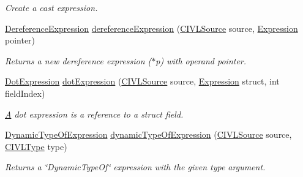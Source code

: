 \begin{DoxyCompactItemize}
\begin{DoxyCompactList}\small\item\em Create a cast expression. \end{DoxyCompactList}\item 
\hyperlink{interfaceedu_1_1udel_1_1cis_1_1vsl_1_1civl_1_1model_1_1IF_1_1expression_1_1DereferenceExpression}{Dereference\+Expression} \hyperlink{interfaceedu_1_1udel_1_1cis_1_1vsl_1_1civl_1_1model_1_1IF_1_1ModelFactory_a0fcf4f15d4e2342201d2f5cc9ed29f3b}{dereference\+Expression} (\hyperlink{interfaceedu_1_1udel_1_1cis_1_1vsl_1_1civl_1_1model_1_1IF_1_1CIVLSource}{C\+I\+V\+L\+Source} source, \hyperlink{interfaceedu_1_1udel_1_1cis_1_1vsl_1_1civl_1_1model_1_1IF_1_1expression_1_1Expression}{Expression} pointer)
\begin{DoxyCompactList}\small\item\em Returns a new dereference expression ($\ast$p) with operand pointer. \end{DoxyCompactList}\item 
\hyperlink{interfaceedu_1_1udel_1_1cis_1_1vsl_1_1civl_1_1model_1_1IF_1_1expression_1_1DotExpression}{Dot\+Expression} \hyperlink{interfaceedu_1_1udel_1_1cis_1_1vsl_1_1civl_1_1model_1_1IF_1_1ModelFactory_a07f99c08ea2f38b4638f7e189403c17e}{dot\+Expression} (\hyperlink{interfaceedu_1_1udel_1_1cis_1_1vsl_1_1civl_1_1model_1_1IF_1_1CIVLSource}{C\+I\+V\+L\+Source} source, \hyperlink{interfaceedu_1_1udel_1_1cis_1_1vsl_1_1civl_1_1model_1_1IF_1_1expression_1_1Expression}{Expression} struct, int field\+Index)
\begin{DoxyCompactList}\small\item\em \hyperlink{structA}{A} dot expression is a reference to a struct field. \end{DoxyCompactList}\item 
\hyperlink{interfaceedu_1_1udel_1_1cis_1_1vsl_1_1civl_1_1model_1_1IF_1_1expression_1_1DynamicTypeOfExpression}{Dynamic\+Type\+Of\+Expression} \hyperlink{interfaceedu_1_1udel_1_1cis_1_1vsl_1_1civl_1_1model_1_1IF_1_1ModelFactory_abe4b9632216b7d76aa00ea8d171c6d80}{dynamic\+Type\+Of\+Expression} (\hyperlink{interfaceedu_1_1udel_1_1cis_1_1vsl_1_1civl_1_1model_1_1IF_1_1CIVLSource}{C\+I\+V\+L\+Source} source, \hyperlink{interfaceedu_1_1udel_1_1cis_1_1vsl_1_1civl_1_1model_1_1IF_1_1type_1_1CIVLType}{C\+I\+V\+L\+Type} type)
\begin{DoxyCompactList}\small\item\em Returns a \char`\"{}\+Dynamic\+Type\+Of\char`\"{} expression with the given type argument. \end{DoxyCompactList}\item 

\end{DoxyCompactItemize}
